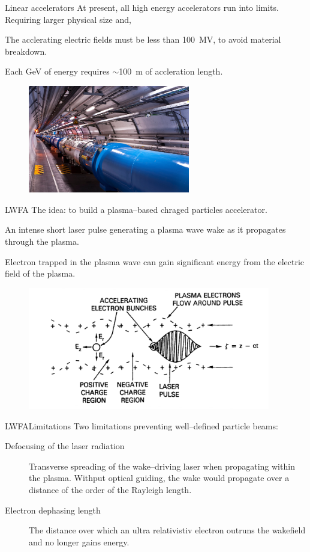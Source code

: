 \documentclass[draft]{beamer}
\begin{document}
  \begin{frame}{Linear accelerators}
    At present, all high energy accelerators run into limits.
    Requiring larger physical size and,

    The acclerating electric fields must be less than \SI{100}{\mega \V}, to avoid material breakdown.

    Each \si{\giga \eV} of energy requires $\sim$\SI{100}{\meter} of accleration length.
    \begin{figure}
      \includegraphics[width=200pt]{figures/lhc_cern_compressed.jpg}
    \end{figure}
  \end{frame}
  \begin{frame}{LWFA}
  The idea: to build a plasma--based chraged particles accelerator.

  An intense short laser pulse generating a plasma wave wake as it propagates through the plasma.

  Electron trapped in the plasma wave can gain significant energy from the electric field of the plasma.
  \begin{figure}
    \includegraphics[width=300pt]{figures/lwfa-schematic.PNG}
  \end{figure}
  \end{frame}
  \begin{frame}{LWFA}{Limitations}
    Two limitations preventing well--defined particle beams:
    \begin{description}
      \item[Defocusing of the laser radiation] Transverse spreading of the wake--driving laser when propagating within the plasma. Withput optical guiding, the wake would propagate over a distance of the order of the Rayleigh length.
      \item[Electron dephasing length] The distance over which an ultra relativistiv electron outruns the wakefield and no longer gains energy.
    \end{description}
  \end{frame}
\end{document}
